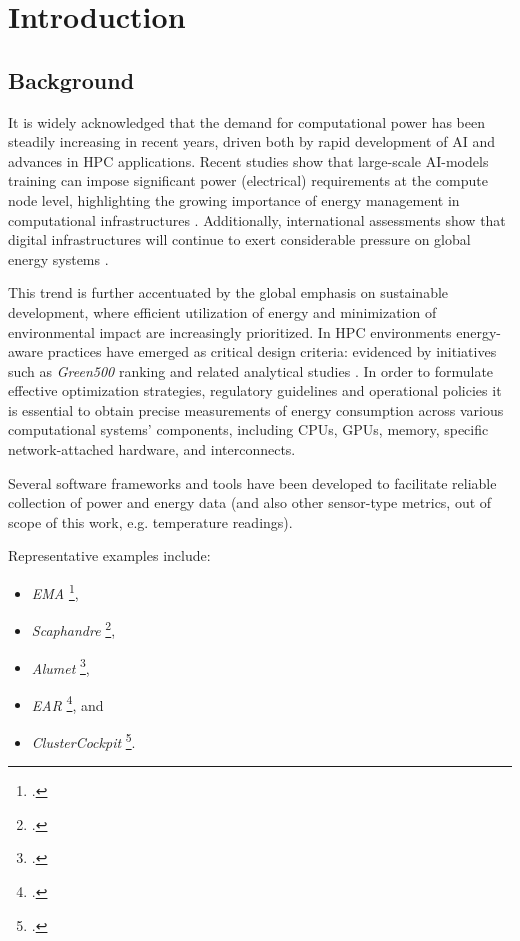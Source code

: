 \section{Introduction}

\subsection{Background}

It is widely acknowledged that the demand for computational power has
been steadily increasing in recent years, driven both by rapid development of
\gls{AI} and advances in \gls{HPC} applications. Recent studies show that
large-scale AI-models training can impose significant power (electrical)
requirements at the compute node level, highlighting the growing importance
of energy management in computational infrastructures \parencite{Latif_2025}.
Additionally, international assessments show that digital infrastructures
will continue to exert considerable pressure on global energy systems
\parencite{IEA2025_AI_Energy}.

This trend is further accentuated by the global emphasis on sustainable
development, where efficient utilization of energy and minimization of
environmental impact are increasingly prioritized. In \gls{HPC} environments
energy-aware practices have emerged as critical design criteria: evidenced by
initiatives such as \emph{Green500} ranking and related analytical studies
\parencite{GreenHPC}. In order to formulate effective optimization strategies,
regulatory guidelines and operational policies it is essential to obtain precise
measurements of energy consumption across various computational systems'
components, including \gls{CPU}s, \gls{GPU}s, memory, specific network-attached
hardware, and interconnects.

Several software frameworks and tools have been developed to facilitate
reliable collection of power and energy data (and also other sensor-type metrics,
out of scope of this work, e.g. temperature readings).

Representative examples include:
\begin{itemize}
  \item \emph{EMA} \footcite{EMA_git},
  \item \emph{Scaphandre} \footcite{Scaphandre},
  \item \emph{Alumet} \footcite{Alumet},
  \item \emph{EAR} \footcite{EAR}, and
  \item \emph{ClusterCockpit} \footcite{ClusterCockpit}.
\end{itemize}

